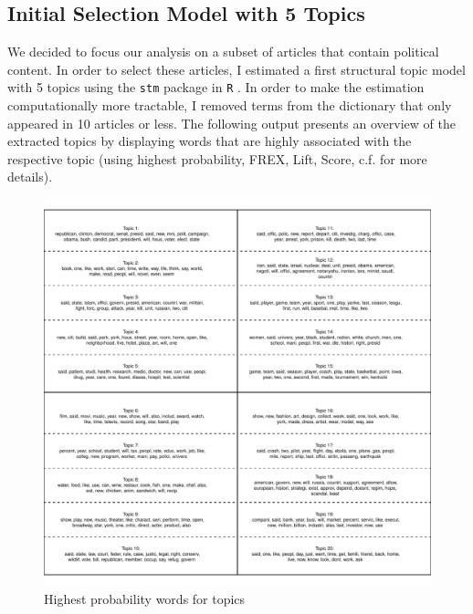 \documentclass[12pt]{article}
\begin{document}
\begin{doublespace}
\section{Initial Selection Model with 5 Topics}

We decided to focus our analysis on a subset of articles that contain political content. In order to select these articles, I estimated a first structural topic model with 5 topics using the \texttt{stm} package in \texttt{R} \citep[using spectral initialization, see][]{roberts2014structural,roberts2014stm}. In order to make the estimation computationally more tractable, I removed terms from the dictionary that only appeared in 10 articles or less. The following output presents an overview of the extracted topics by displaying words that are highly associated with the respective topic (using highest probability, FREX, Lift, Score, c.f. \citealt{roberts2014stm} for more details).

\begin{figure}
\caption{Highest probability words for topics}\label{fig:words}
\includegraphics[width=\textwidth]{../calc/fig/words}
\end{figure}



\end{doublespace}
\end{document}
